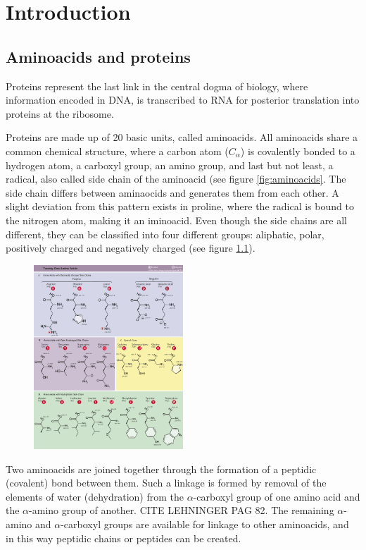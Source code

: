 \documentclass[11pt, a4paper]{report}
\begin{document}
\chapter{Introduction}
\label{chap:introduction}

\section{Aminoacids and proteins}

Proteins represent the last link in the central dogma of biology, where information encoded in DNA, is transcribed to RNA for posterior translation into proteins at the ribosome.

Proteins are made up of 20 basic units, called aminoacids. All aminoacids share a common chemical structure, where a carbon atom ($C_\alpha$) is covalently bonded to a hydrogen atom, a carboxyl group, an amino group, and last but not least, a radical, also called side chain of the aminoacid (see figure \ref{fig:aminoacids}. The side chain differs between aminaocids and generates them from each other. A slight deviation from this pattern exists in proline, where the radical is bound to the nitrogen atom, making it an iminoacid. Even though the side chains are all different, they can be classified into four different groups: aliphatic, polar, positively charged and negatively charged (see figure \ref{fig:aminaocids}).

\begin{figure}
  \centering
  \includegraphics[width=0.5\textwidth]{aminoacids.png}
  \caption{}
  \label{fig:aminaocids}
\end{figure}

Two aminoacids are joined together through the formation of a peptidic (covalent) bond between them. Such a linkage is formed by removal of the elements of water (dehydration) from the $\alpha$-carboxyl group of one amino acid and the $\alpha$-amino group of another. CITE LEHNINGER PAG 82. The remaining $\alpha$-amino and $\alpha$-carboxyl groups are available for linkage to other aminoacids, and in this way peptidic chains or peptides can be created.
\end{document}
